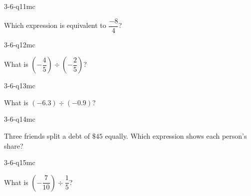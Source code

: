 \begin{practiceQuestion}{3-6-q11}{mc}
\begin{questionText}
Which expression is equivalent to $\dfrac{-8}{4}$?
\end{questionText}
\end{practiceQuestion}

\begin{practiceQuestion}{3-6-q12}{mc}
\begin{questionText}
What is $\left(-\dfrac{4}{5}\right) \div \left(-\dfrac{2}{5}\right)$?
\end{questionText}
\end{practiceQuestion}

\begin{practiceQuestion}{3-6-q13}{mc}
\begin{questionText}
What is $(-6.3) \div (-0.9)$?
\end{questionText}
\end{practiceQuestion}

\begin{practiceQuestion}{3-6-q14}{mc}
\begin{questionText}
Three friends split a debt of $\$45$ equally. Which expression shows each person's share?
\end{questionText}
\end{practiceQuestion}

\begin{practiceQuestion}{3-6-q15}{mc}
\begin{questionText}
What is $\left(-\dfrac{7}{10}\right) \div \dfrac{1}{5}$?
\end{questionText}
\end{practiceQuestion}

